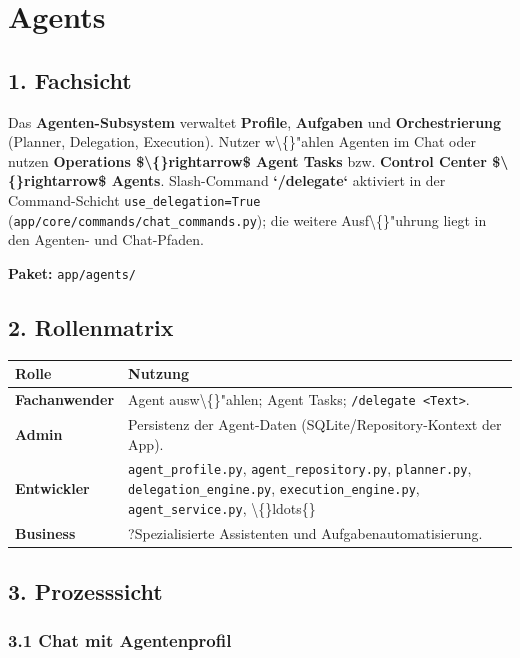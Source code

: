\section{Agents}

\subsection{1. Fachsicht}

Das \textbf{Agenten-Subsystem} verwaltet \textbf{Profile}, \textbf{Aufgaben} und \textbf{Orchestrierung} (Planner, Delegation, Execution). Nutzer w\textbackslash\{\}"ahlen Agenten im Chat oder nutzen \textbf{Operations \$\textbackslash\{\}rightarrow\$ Agent Tasks} bzw. \textbf{Control Center \$\textbackslash\{\}rightarrow\$ Agents}. Slash-Command \textbf{`/delegate`} aktiviert in der Command-Schicht \texttt{use\_delegation=True} (\texttt{app/core/commands/chat\_commands.py}); die weitere Ausf\textbackslash\{\}"uhrung liegt in den Agenten- und Chat-Pfaden.

\textbf{Paket:} \texttt{app/agents/}

\subsection{2. Rollenmatrix}

\begin{center}
\begin{tabular}{ll}
\hline
Rolle & Nutzung \\
\hline
\textbf{Fachanwender} & Agent ausw\textbackslash\{\}"ahlen; Agent Tasks; \texttt{/delegate <Text>}. \\
\textbf{Admin} & Persistenz der Agent-Daten (SQLite/Repository-Kontext der App). \\
\textbf{Entwickler} & \texttt{agent\_profile.py}, \texttt{agent\_repository.py}, \texttt{planner.py}, \texttt{delegation\_engine.py}, \texttt{execution\_engine.py}, \texttt{agent\_service.py}, \textbackslash\{\}ldots\{\} \\
\textbf{Business} & ?Spezialisierte Assistenten\texttt{} und Aufgabenautomatisierung. \\
\hline
\end{tabular}
\end{center}

\subsection{3. Prozesssicht}

\subsubsection{3.1 Chat mit Agentenprofil}

